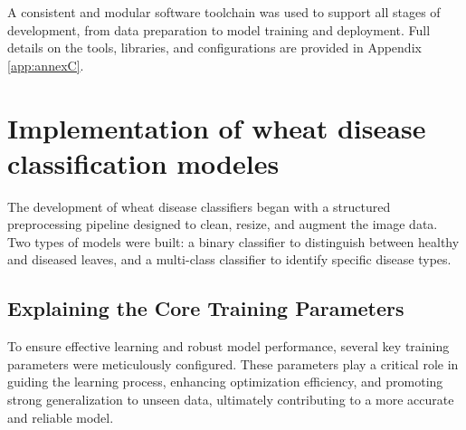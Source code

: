 A consistent and modular software toolchain was used to support all stages of development, from data preparation to model training and deployment. Full details on the tools, libraries, and configurations are provided in Appendix \ref{app:annexC}.

\section{Implementation of wheat disease  classification modeles}
The development of wheat disease classifiers began with a structured preprocessing pipeline designed to clean, resize, and augment the image data. Two types of models were built: a binary classifier to distinguish between healthy and diseased leaves, and a multi-class classifier to identify specific disease types. 
\subsection{Explaining the Core Training Parameters}
To ensure effective learning and robust model performance, several key training parameters were meticulously configured. These parameters play a critical role in guiding the learning process, enhancing optimization efficiency, and promoting strong generalization to unseen data, ultimately contributing to a more accurate and reliable model.

